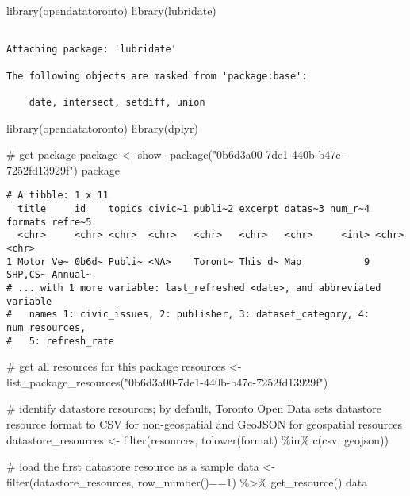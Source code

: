 \documentclass[
  letterpaper,
  DIV=11,
  numbers=noendperiod]{scrartcl}
\newenvironment{Shaded}{\begin{snugshade}}{\end{snugshade}}
\newcommand{\CommentTok}[1]{\textcolor[rgb]{0.37,0.37,0.37}{#1}}
\newcommand{\DecValTok}[1]{\textcolor[rgb]{0.68,0.00,0.00}{#1}}
\newcommand{\FunctionTok}[1]{\textcolor[rgb]{0.28,0.35,0.67}{#1}}
\newcommand{\NormalTok}[1]{\textcolor[rgb]{0.00,0.23,0.31}{#1}}
\newcommand{\OtherTok}[1]{\textcolor[rgb]{0.00,0.23,0.31}{#1}}
\newcommand{\SpecialCharTok}[1]{\textcolor[rgb]{0.37,0.37,0.37}{#1}}
\newcommand{\StringTok}[1]{\textcolor[rgb]{0.13,0.47,0.30}{#1}}
\begin{document}
\begin{Shaded}
\begin{Highlighting}[]
\FunctionTok{library}\NormalTok{(opendatatoronto)}
\FunctionTok{library}\NormalTok{(lubridate)}
\end{Highlighting}
\end{Shaded}

\begin{verbatim}

Attaching package: 'lubridate'

The following objects are masked from 'package:base':

    date, intersect, setdiff, union
\end{verbatim}

\begin{Shaded}
\begin{Highlighting}[]
\FunctionTok{library}\NormalTok{(opendatatoronto)}
\FunctionTok{library}\NormalTok{(dplyr)}

\CommentTok{\# get package}
\NormalTok{package }\OtherTok{\textless{}{-}} \FunctionTok{show\_package}\NormalTok{(}\StringTok{"0b6d3a00{-}7de1{-}440b{-}b47c{-}7252fd13929f"}\NormalTok{)}
\NormalTok{package}
\end{Highlighting}
\end{Shaded}

\begin{verbatim}
# A tibble: 1 x 11
  title     id    topics civic~1 publi~2 excerpt datas~3 num_r~4 formats refre~5
  <chr>     <chr> <chr>  <chr>   <chr>   <chr>   <chr>     <int> <chr>   <chr>  
1 Motor Ve~ 0b6d~ Publi~ <NA>    Toront~ This d~ Map           9 SHP,CS~ Annual~
# ... with 1 more variable: last_refreshed <date>, and abbreviated variable
#   names 1: civic_issues, 2: publisher, 3: dataset_category, 4: num_resources,
#   5: refresh_rate
\end{verbatim}

\begin{Shaded}
\begin{Highlighting}[]
\CommentTok{\# get all resources for this package}
\NormalTok{resources }\OtherTok{\textless{}{-}} \FunctionTok{list\_package\_resources}\NormalTok{(}\StringTok{"0b6d3a00{-}7de1{-}440b{-}b47c{-}7252fd13929f"}\NormalTok{)}

\CommentTok{\# identify datastore resources; by default, Toronto Open Data sets datastore resource format to CSV for non{-}geospatial and GeoJSON for geospatial resources}
\NormalTok{datastore\_resources }\OtherTok{\textless{}{-}} \FunctionTok{filter}\NormalTok{(resources, }\FunctionTok{tolower}\NormalTok{(format) }\SpecialCharTok{\%in\%} \FunctionTok{c}\NormalTok{(}\StringTok{\textquotesingle{}csv\textquotesingle{}}\NormalTok{, }\StringTok{\textquotesingle{}geojson\textquotesingle{}}\NormalTok{))}

\CommentTok{\# load the first datastore resource as a sample}
\NormalTok{data }\OtherTok{\textless{}{-}} \FunctionTok{filter}\NormalTok{(datastore\_resources, }\FunctionTok{row\_number}\NormalTok{()}\SpecialCharTok{==}\DecValTok{1}\NormalTok{) }\SpecialCharTok{\%\textgreater{}\%} \FunctionTok{get\_resource}\NormalTok{()}
\NormalTok{data}
\end{Highlighting}
\end{Shaded}
\end{document}
